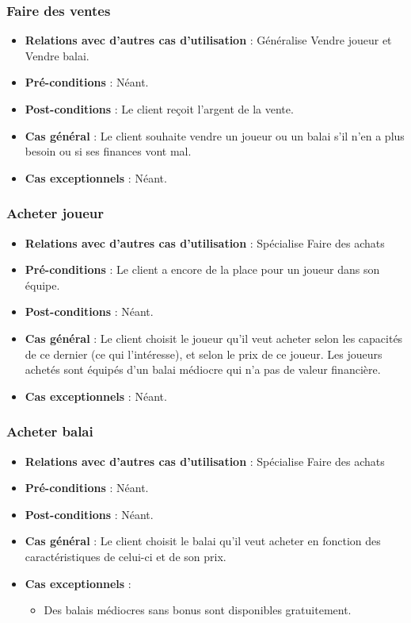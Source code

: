 \documentclass[a4paper,titlepage]{scrreprt}
\begin{document}
    \subsubsection{Faire des ventes}
      \begin{itemize}
        \item \textbf{Relations avec d'autres cas d'utilisation}  : Généralise Vendre joueur et Vendre balai.
        \item \textbf{Pré-conditions} : Néant.
        \item \textbf{Post-conditions} :  Le client reçoit l’argent de la vente.
        \item \textbf{Cas général} : Le client souhaite vendre un joueur ou un balai s’il n’en a plus besoin ou si ses finances vont mal. 
        \item \textbf{Cas exceptionnels} : Néant.
      \end{itemize}
    \subsubsection{Acheter joueur}
      \begin{itemize}
        \item \textbf{Relations avec d'autres cas d'utilisation}  : Spécialise Faire des achats
        \item \textbf{Pré-conditions} : Le client a encore de la place pour un joueur dans son équipe.
        \item \textbf{Post-conditions} : Néant.
        \item \textbf{Cas général} : Le client choisit le joueur qu’il veut acheter selon les capacités de ce dernier (ce qui l’intéresse), et selon le prix de ce joueur. Les joueurs achetés sont équipés d'un balai médiocre qui n'a pas de valeur financière.
        \item \textbf{Cas exceptionnels} : Néant.
      \end{itemize}
    \subsubsection{Acheter balai}
      \begin{itemize}
        \item \textbf{Relations avec d'autres cas d'utilisation}  : Spécialise Faire des achats
        \item \textbf{Pré-conditions} : Néant.
        \item \textbf{Post-conditions} : Néant.
        \item \textbf{Cas général} : Le client choisit le balai qu’il veut acheter en fonction des caractéristiques de celui-ci et de son prix. 
        \item \textbf{Cas exceptionnels} :
          \begin{itemize}
            \item Des balais médiocres sans bonus sont disponibles gratuitement.
          \end{itemize}
      \end{itemize}
\end{document}
